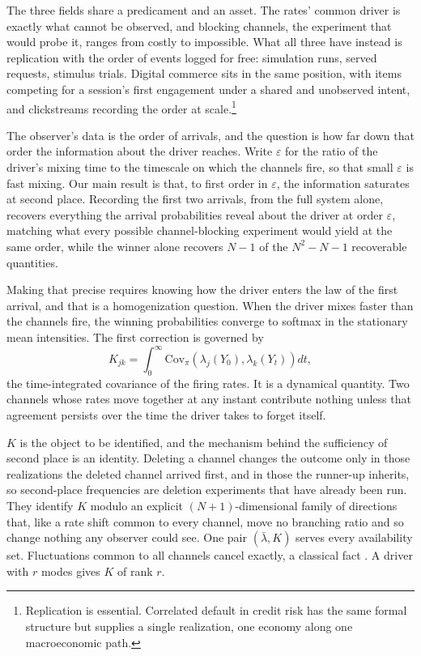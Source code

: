 \documentclass[11pt]{article}
\theoremstyle{remark}
\newcommand{\lbar}{\bar{\lambda}}
\begin{document}
The three fields share a predicament and an asset. The rates' common driver is
exactly what cannot be observed, and blocking channels, the experiment that
would probe it, ranges from costly to impossible. What all three have instead
is replication with the order of events logged for free: simulation runs,
served requests, stimulus trials. Digital commerce sits in the same position,
with items competing for a session's first engagement under a shared and
unobserved intent, and clickstreams recording the order at
scale.\footnote{Replication is essential. Correlated default in credit risk
has the same formal structure but supplies a single realization, one economy
along one macroeconomic path.}

The observer's data is the order of arrivals, and the question is how far down
that order the information about the driver reaches. Write $\varepsilon$ for
the ratio of the driver's mixing time to the timescale on which the channels
fire, so that small $\varepsilon$ is fast mixing. Our main result is that, to
first order in $\varepsilon$, the information saturates at second place.
Recording the first two arrivals, from the full system alone, recovers
everything the arrival probabilities reveal about the driver at order
$\varepsilon$, matching what every possible channel-blocking experiment would
yield at the same order, while the winner alone recovers $N-1$ of the
$N^2-N-1$ recoverable quantities.

Making that precise requires knowing how the driver enters the law of the
first arrival, and that is a homogenization question. When the driver mixes faster than the
channels fire, the winning probabilities converge to softmax in the stationary
mean intensities. The first correction is governed by
\begin{equation}\label{eq:Kintro}
  K_{jk} = \int_0^\infty \mathrm{Cov}_\pi\!\left(\lambda_j(Y_0),
  \lambda_k(Y_t)\right) dt ,
\end{equation}
the time-integrated covariance of the firing rates. It is a dynamical
quantity. Two channels whose rates move together at any instant contribute
nothing unless that agreement persists over the time the driver takes to
forget itself.

$K$ is the object to be identified, and the mechanism behind the sufficiency
of second place is an identity. Deleting a channel changes the outcome only in
those realizations the deleted channel arrived first, and in those the
runner-up inherits, so second-place frequencies are deletion experiments that
have already been run. They identify $K$ modulo an explicit
$(N{+}1)$-dimensional family of directions that, like a rate shift common to
every channel, move no branching ratio and so change nothing any observer
could see. One pair $(\lbar, K)$ serves every availability set. Fluctuations
common to all channels cancel exactly, a classical fact
\citep{elandt1976,marley1992}. A driver with $r$ modes gives $K$ of rank $r$.
\end{document}
